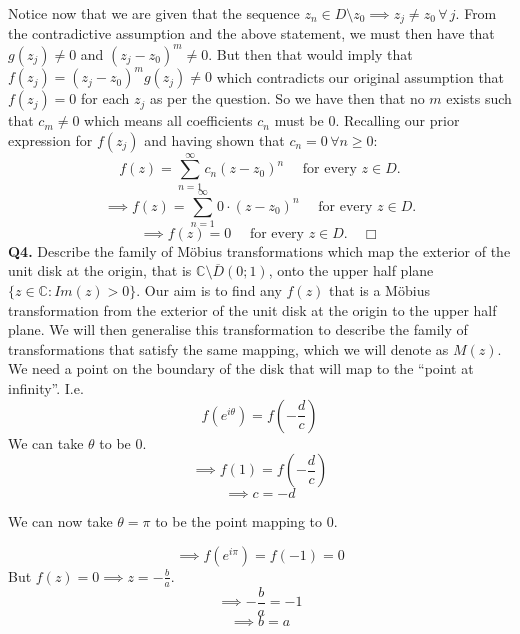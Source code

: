 \documentclass[12pt]{article}
\begin{document}
\noindent Notice now that we are given that the sequence \(z_n \in D\setminus z_0 \implies z_j \neq z_0 \, \forall \, j\). \newline
\linebreak
\noindent From the contradictive assumption and the above statement, we must then have that \(g(z_j) \neq 0\) and \(\left(z_j-z_0\right)^m \neq 0\). \newline 
\linebreak
\noindent But then that would imply that \(f(z_j) = \left(z_j-z_0\right)^m g(z_j) \neq 0\) which contradicts our original assumption that \(f(z_j) = 0 \) for each \(z_j\) as per the question.\newline
\linebreak
\noindent So we have then that no \(m\) exists such that \(c_m \neq 0\) which means all coefficients \(c_n\) must be 0. \newline
\linebreak
\noindent Recalling our prior expression for \(f(z_j)\) and having shown that \(c_n = 0 \, \forall n \geq 0\):
\[
f(z) = \sum_{n=1}^{\infty}c_n \left(z-z_0\right)^n \quad \text{ for every } z\in D.
\]
\[
\implies f(z) = \sum_{n=1}^{\infty}0 \cdot \left(z-z_0\right)^n \quad \text{ for every } z\in D.
\]
\[
    \implies f(z) = 0  \quad \text{ for every } z\in D. \quad \Box
\]
\[\]
\noindent \textbf{Q4.} Describe the family of M\"obius transformations which map the exterior of the unit disk at the origin, that is \( \mathbb{C} \setminus \overline{D}(0;1) \), onto the upper half plane \( \{z \in \mathbb{C}: Im(z) > 0 \}\).\newline
\linebreak
\noindent Our aim is to find any \(f(z)\) that is a M\"obius transformation from the exterior of the unit disk at the origin to the upper half plane. We will then generalise this transformation to describe the family of transformations that satisfy the same mapping, which we will denote as \(M(z)\).\newline
\linebreak
\noindent We need a point on the boundary of the disk that will map to the ``point at infinity''.  I.e.
\[
f(e^{i\theta}) = f(-\frac{d}{c})
\]
\noindent We can take \(\theta\) to be \(0 \).
\[
    \implies f(1) = f(-\frac{d}{c})
\]
\[
\implies c = -d 
\]

\noindent We can now take \(\theta = \pi\) to be the point mapping to \(0\).

\[
\implies f(e^{i\pi}) = f(-1) = 0
\]
\noindent But \(f(z) = 0 \implies z = -\frac{b}{a}\).
\[
\implies -\frac{b}{a} = -1
\]
\[
\implies b = a
\]
\end{document}
